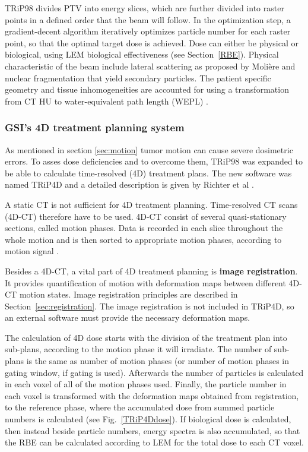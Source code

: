 TRiP98 divides PTV into energy slices, which are further divided into raster points in a defined order that the beam will follow. In the optimization step, a gradient-decent algorithm iteratively optimizes particle number
for each raster point, so that the optimal target dose is achieved. Dose can either be physical or biological, using LEM biological effectiveness (see Section~\ref{RBE}).
Physical characteristic of the beam include lateral scattering as proposed by Moli\`ere \cite{Moliere1948} and nuclear fragmentation that yield secondary particles. The patient specific
geometry and tissue inhomogeneities are accounted for using a transformation from CT HU to water-equivalent path length (WEPL) \cite{Geiss1999,Jaekel2001,Rietzel2007}.


\subsubsection{GSI's 4D treatment planning system}

As mentioned in section \ref{sec:motion} tumor motion can cause severe dosimetric errors. To asses dose deficiencies and to overcome them, TRiP98 was expanded to be able to calculate time-resolved (4D) treatment plans. The new software was named TRiP4D and a detailed description is given by Richter et al \cite{Richter2013}.

A static CT is not sufficient for 4D treatment planning. Time-resolved CT scans (4D-CT) therefore have to be used. 4D-CT consist of several quasi-stationary sections, called motion phases. Data is
recorded in each slice throughout the whole motion and is then sorted to appropriate motion phases, according to motion signal \cite{Rietzel2005}.

Besides a 4D-CT, a vital part of 4D treatment planning is \textbf{image registration}. It provides quantification of motion with deformation maps between different 4D-CT motion states. Image registration principles are described in Section~\ref{sec:registration}. The image registration is not included in TRiP4D, so an external software must provide the necessary
deformation maps.

The calculation of 4D dose starts with the division of the treatment plan into sub-plans, according to the motion phase it will irradiate. The number of sub-plans is the same as number of motion phases (or number of motion phases
in gating window, if gating is used). Afterwards the number of particles is calculated in each voxel of all of the motion phases used. Finally, the particle number in each voxel is transformed with the deformation maps
obtained from registration, to the reference phase, where the accumulated dose from summed particle numbers is calculated (see Fig.~\ref{TRiP4Ddose}). If biological dose is calculated, then instead beside particle numbers, energy spectra is also accumulated, 
so that the RBE can be calculated according to LEM for the total dose to each CT voxel.

